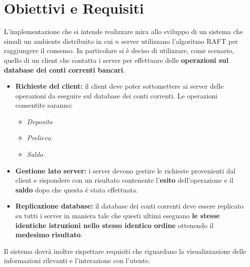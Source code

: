\section{Obiettivi e Requisiti}
	L'implementazione che si intende realizzare mira allo sviluppo di un sistema che simuli un ambiente distribuito in cui $n$ server utilizzano l'algoritmo RAFT per raggiungere il consenso. In particolare si è deciso di utilizzare, come scenario, quello di un client che contatta i server per effettuare delle \textbf{ operazioni sul database dei conti correnti bancari}.
	\begin{itemize}
			\item \textbf{Richieste del client:} il client deve poter sottomettere ai server delle operazioni da eseguire sul database dei conti correnti. Le operazioni consentite saranno:
				\begin{itemize}
					\item \emph{Deposito}
					\item \emph{Prelievo}
					\item \emph{Saldo}
				\end{itemize}
			\item \textbf{Gestione lato server:} i server devono gestire le richieste provenienti dal client e rispondere con un risultato contenente l'\textbf{esito} dell'operazione e il \textbf{saldo} dopo che questa è stata effettuata.
			\item \textbf{Replicazione database:} il database dei conti correnti deve essere replicato su tutti i server in maniera tale che questi ultimi eseguano \textbf{le stesse identiche istruzioni nello stesso identico ordine} ottenendo il \textbf{medesimo risultato}.
		\end{itemize}

	Il sistema dovrà inoltre rispettare requisiti che riguardano la visualizzazione delle informazioni rilevanti e l'interazione con l'utente.



